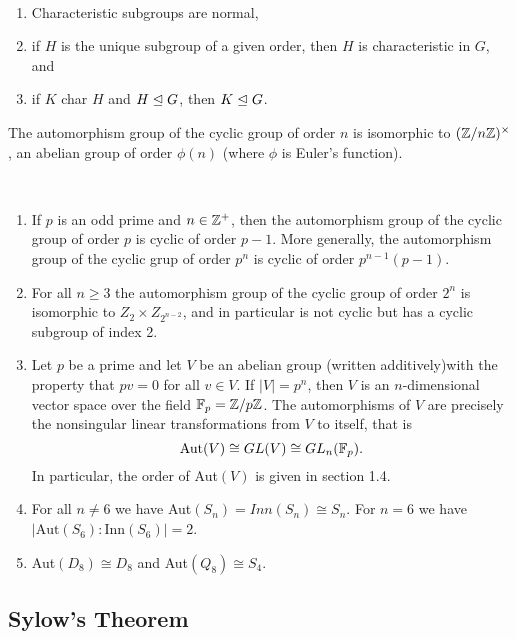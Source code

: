 \documentclass[../main]{subfiles}
\begin{document}
 
 \begin{nt}
  ~\begin{enumerate}
    \item Characteristic subgroups are normal,
    \item if $H$ is the unique subgroup of a given order, then $H$ is characteristic in $G$, and
    \item if $K$ char $H$ and $H \trianglelefteq G$, then $K \trianglelefteq G$.
   \end{enumerate}
 \end{nt}

 
 \begin{prop}
  The automorphism group of the cyclic group of order $n$ is isomorphic to $(\mathbb{Z}/n\mathbb{Z})^\times$, an abelian group of order $\phi(n)$ (where $\phi$ is Euler's function).
 \end{prop}
 
 
 \begin{prop}
  ~\begin{enumerate}
    \item If $p$ is an odd prime and $n \in \mathbb{Z}^+$, then the automorphism group of the cyclic group of order $p$ is cyclic of order $p-1$. More generally, the automorphism group of the cyclic grup of order $p^n$ is cyclic of order $p^{n-1}(p-1)$.
    \item For all $n\geq 3$ the automorphism group of the cyclic group of order $2^n$ is isomorphic to $Z_2 \times Z_{2^{n-2}}$, and in particular is not cyclic but has a cyclic subgroup of index 2.
    \item Let $p$ be a prime and let $V$  be an abelian group (written additively)with the property that $pv=0$ for all $v\in V$. If $|V|=p^n$, then $V$ is an $n$-dimensional vector space over the field $\mathbb{F}_p = \mathbb{Z}/p\mathbb{Z}$. The automorphisms of $V$ are precisely the nonsingular linear transformations from $V$ to itself, that is 
    \[\text{Aut}(V) \cong GL(V) \cong GL_n(\mathbb{F}_p).\]
    In particular, the order of Aut$(V)$ is given in section 1.4.
    \item For all $n \neq 6$ we have Aut$(S_n) = Inn(S_n) \cong S_n$. For $n = 6$ we have \\ $|\text{Aut}(S_6):\text{Inn}(S_6)| = 2$.
    \item Aut$(D_8) \cong D_8$ and Aut$(Q_8) \cong S_4$. 
   \end{enumerate}
 \end{prop}
 
 
 \subsection{Sylow's Theorem}
 
\end{document}
